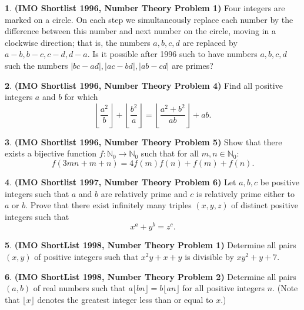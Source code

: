 \documentclass{article}
\newcommand{\plus}{+}
\newcommand{\minus}{-}
\newcommand{\equal}{=}
\theoremstyle{definition}
\newtheorem{p}{}
\begin{document}
\begin{p}{\bf (IMO Shortlist 1996, Number Theory Problem 1)}
Four integers are marked on a circle. On each step we simultaneously replace each number by the difference between this number and next number on the circle, moving in a clockwise direction; that is, the numbers $ a,b,c,d$ are replaced by $ a\minus{}b,b\minus{}c,c\minus{}d,d\minus{}a.$ Is it possible after 1996 such to have numbers $ a,b,c,d$ such the numbers $ |bc\minus{}ad|, |ac \minus{} bd|, |ab \minus{} cd|$ are primes?
\end{p}



\begin{p}{\bf (IMO Shortlist 1996, Number Theory Problem 4)}
Find all positive integers $ a$ and $ b$ for which 
\[ \left \lfloor \frac{a^2}{b} \right \rfloor \plus{} \left \lfloor \frac{b^2}{a} \right \rfloor \equal{} \left \lfloor \frac{a^2 \plus{} b^2}{ab} \right \rfloor \plus{} ab.\]
\end{p}



\begin{p}{\bf (IMO Shortlist 1996, Number Theory Problem 5)}
Show that there exists a bijective function $ f: \mathbb{N}_{0}\to \mathbb{N}_{0}$ such that for all $ m,n\in \mathbb{N}_{0}$:
\[ f(3mn \plus{} m \plus{} n) \equal{} 4f(m)f(n) \plus{} f(m) \plus{} f(n).\]
\end{p}





\begin{p}{\bf (IMO Shortlist 1997, Number Theory Problem 6)}
Let $a, b, c$ be positive integers such that $a$ and $b$ are relatively prime and $c$ is relatively prime either to $a$ or $b$. Prove that there exist infinitely many triples $(x, y, z)$ of distinct positive integers such that \[x^{a}+y^{b}= z^{c}.\]
\end{p}



\begin{p}{\bf (IMO ShortList 1998, Number Theory Problem 1)}
Determine all pairs $(x,y)$ of positive integers such that $x^{2}y+x+y$ is divisible by $xy^{2}+y+7$.
\end{p}




\begin{p}{\bf (IMO ShortList 1998, Number Theory Problem 2)}
Determine all pairs $(a,b)$ of real numbers such that $a \lfloor bn \rfloor =b \lfloor an \rfloor $ for all positive integers $n$. (Note that $\lfloor x\rfloor $ denotes the greatest integer less than or equal to $x$.)
\end{p}
\end{document}
